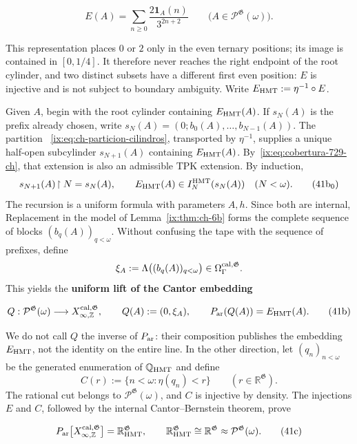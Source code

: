 \[
 E(A)=\sum_{n\ge0}\frac{2\mathbf1_A(n)}{3^{2n+2}}
 \qquad
 \bigl(A\in\mathcal P^{\mathfrak G}(\omega)\bigr).
\tag{41a}\label{ix:eq:ch-incrustacion-cantor}
\]

This representation places \(0\) or \(2\) only in the even ternary positions;
its image is contained in \([0,1/4]\). It therefore never reaches the right
endpoint of the root cylinder, and two distinct subsets have a different first
even position: \(E\) is injective and is not subject to boundary ambiguity.
Write \(E_{\rm HMT}:=\eta^{-1}\circ E\).

Given \(A\), begin with the root cylinder containing \(E_{\rm HMT}(A)\). If
\(s_N(A)\) is the prefix already chosen, write
\(s_N(A)=(0;b_0(A),\ldots,b_{N-1}(A))\). The partition
~\eqref{ix:eq:ch-particion-cilindros}, transported by \(\eta^{-1}\), supplies a
unique half-open subcylinder \(s_{N+1}(A)\) containing
\(E_{\rm HMT}(A)\). By~\eqref{ix:eq:cobertura-729-ch}, that extension is also an
admissible TPK extension. By induction,
\[
 s_{N+1}(A)\!\upharpoonright N=s_N(A),\qquad
 E_{\rm HMT}(A)\in I_N^{\rm HMT}(s_N(A))\quad(N<\omega).
\tag{41b$_0$}\label{ix:eq:ch-prefijos-uniformes}
\]
The recursion is a uniform formula with parameters \(A,h\). Since both are
internal, Replacement in the model of Lemma~\ref{ix:thm:ch-6b} forms the complete
sequence of blocks \((b_q(A))_{q<\omega}\). Without confusing the tape with
the sequence of prefixes, define
\[
 \xi_A:=\Lambda\bigl((b_q(A))_{q<\omega}\bigr)
 \in\Omega_\Gamma^{\rm cal,\mathfrak G}.
\]
This yields the \textbf{uniform lift of the Cantor embedding}

\[
 Q:\mathcal P^{\mathfrak G}(\omega)
 \longrightarrow X_{\infty,\mathbb Z}^{\rm cal,\mathfrak G},
 \qquad
 Q(A):=(0,\xi_A),\qquad
 P_{\rm ar}(Q(A))=E_{\rm HMT}(A).
\tag{41b}\label{ix:eq:ch-levantamiento-uniforme}
\]

We do not call \(Q\) the inverse of \(P_{\rm ar}\): their composition publishes the
embedding \(E_{\rm HMT}\), not the identity on the entire line. In the other
direction, let \((q_n)_{n<\omega}\) be the generated enumeration of
\(\mathbb Q_{\rm HMT}\) and define
\[
 C(r):=\{n<\omega:\eta(q_n)<r\}
 \qquad(r\in\mathbb R^{\mathfrak G}).
\]
The rational cut belongs to \(\mathcal P^{\mathfrak G}(\omega)\), and \(C\)
is injective by density. The injections \(E\) and \(C\), followed by the
internal Cantor--Bernstein theorem, prove

\[
 P_{\rm ar}
 \bigl[X_{\infty,\mathbb Z}^{\rm cal,\mathfrak G}\bigr]
 =\mathbb R_{\rm HMT}^{\mathfrak G},
 \qquad
 \mathbb R_{\rm HMT}^{\mathfrak G}
 \cong\mathbb R^{\mathfrak G}
 \approx\mathcal P^{\mathfrak G}(\omega).
\tag{41c}\label{ix:eq:ch-recta-potencia}
\]

